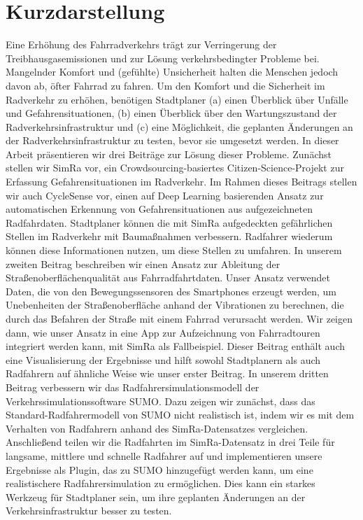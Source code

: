 \newpage
{}
\section*{Kurzdarstellung}
Eine Erhöhung des Fahrradverkehrs trägt zur Verringerung der Treibhausgasemissionen und zur Lösung verkehrsbedingter Probleme bei.
Mangelnder Komfort und (gefühlte) Unsicherheit halten die Menschen jedoch davon ab, öfter Fahrrad zu fahren.
Um den Komfort und die Sicherheit im Radverkehr zu erhöhen, benötigen Stadtplaner (a) einen Überblick über Unfälle und Gefahrensituationen, (b) einen Überblick über den Wartungszustand der Radverkehrsinfrastruktur und (c) eine Möglichkeit, die geplanten Änderungen an der Radverkehrsinfrastruktur zu testen, bevor sie umgesetzt werden.
In dieser Arbeit präsentieren wir drei Beiträge zur Lösung dieser Probleme.
Zunächst stellen wir SimRa vor, ein Crowdsourcing-basiertes Citizen-Science-Projekt zur Erfassung Gefahrensituationen im Radverkehr.
Im Rahmen dieses Beitrags stellen wir auch CycleSense vor, einen auf Deep Learning basierenden Ansatz zur automatischen Erkennung von Gefahrensituationen aus aufgezeichneten Radfahrdaten.
Stadtplaner können die mit SimRa aufgedeckten gefährlichen Stellen im Radverkehr mit Baumaßnahmen verbessern.
Radfahrer wiederum können diese Informationen nutzen, um diese Stellen zu umfahren.
In unserem zweiten Beitrag beschreiben wir einen Ansatz zur Ableitung der Straßenoberflächenqualität aus Fahrradfahrtdaten.
Unser Ansatz verwendet Daten, die von den Bewegungssensoren des Smartphones erzeugt werden, um Unebenheiten der Straßenoberfläche anhand der Vibrationen zu berechnen, die durch das Befahren der Straße mit einem Fahrrad verursacht werden. 
Wir zeigen dann, wie unser Ansatz in eine App zur Aufzeichnung von Fahrradtouren integriert werden kann, mit SimRa als Fallbeispiel.
Dieser Beitrag enthält auch eine Visualisierung der Ergebnisse und hilft sowohl Stadtplanern als auch Radfahrern auf ähnliche Weise wie unser erster Beitrag.
In unserem dritten Beitrag verbessern wir das Radfahrersimulationsmodell der Verkehrssimulationssoftware SUMO.
Dazu zeigen wir zunächst, dass das Standard-Radfahrermodell von SUMO nicht realistisch ist, indem wir es mit dem Verhalten von Radfahrern anhand des SimRa-Datensatzes vergleichen.
Anschließend teilen wir die Radfahrten im SimRa-Datensatz in drei Teile für langsame, mittlere und schnelle Radfahrer auf und implementieren unsere Ergebnisse als Plugin, das zu SUMO hinzugefügt werden kann, um eine realistischere Radfahrersimulation zu ermöglichen.
Dies kann ein starkes Werkzeug für Stadtplaner sein, um ihre geplanten Änderungen an der Verkehrsinfrastruktur besser zu testen. 